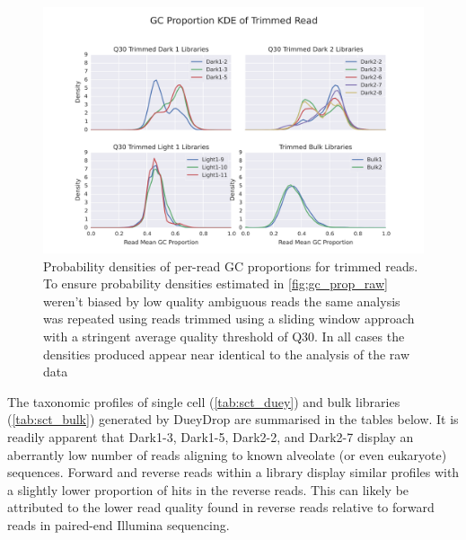 \begin{figure}[h]
    \includegraphics[width=\textwidth]{lib_gc_prop_q30_trimmed.svg}
    \caption{Probability densities of per-read GC proportions for trimmed reads.
             To ensure probability densities estimated in \ref{fig;gc_prop_raw}
         weren't biased by low quality ambiguous reads the same analysis was
     repeated using reads trimmed using a sliding window approach with a stringent average
 quality threshold of Q30.  In all cases the densities produced appear near identical to
 the analysis of the raw data}
    \label{fig:gc_prop_q30}
\end{figure}

The taxonomic profiles of single cell (\ref{tab:sct_duey}) and bulk libraries (\ref{tab:sct_bulk}) 
generated by DueyDrop are summarised in the tables below.  It is readily apparent 
that Dark1-3, Dark1-5, Dark2-2, and Dark2-7 display an aberrantly low number of reads
aligning to known alveolate (or even eukaryote) sequences. 
Forward and reverse reads within a library display similar profiles with a slightly
lower proportion of hits in the reverse reads. This can likely be attributed to
the lower read quality found in reverse reads relative to forward reads 
in paired-end Illumina sequencing. 

